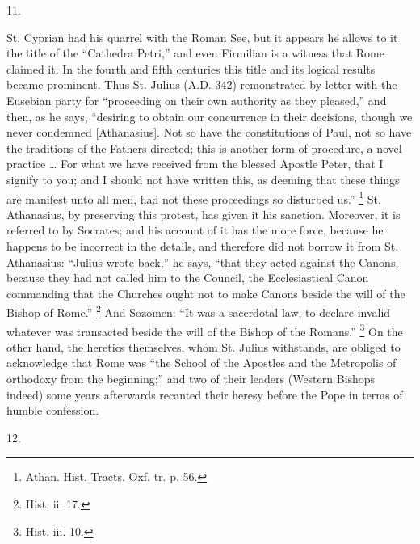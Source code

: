 11.

St. Cyprian had his quarrel with the Roman See, but it
appears he allows to it the title of the ``Cathedra
Petri,'' and even Firmilian is a witness that Rome
claimed it. In the fourth and fifth centuries this title
and its logical results became prominent. Thus St. Julius (A.D. 342) remonstrated by letter with the Eusebian party
for ``proceeding on their own authority as they
pleased,'' and then, as he says, ``desiring to
obtain our concurrence in their decisions, though we
never condemned [Athanasius]. Not so have the
constitutions of Paul, not so have the traditions of the
Fathers directed; this is another form of procedure, a
novel practice … For what we have received from the
blessed Apostle Peter, that I signify to you; and I
should not have written this, as deeming that these
things are manifest unto all men, had not these
proceedings so disturbed us.'' \footnote{Athan. Hist. Tracts. Oxf. tr.
p. 56.} St. Athanasius, by
preserving this protest, has given it his sanction.
Moreover, it is referred to by Socrates; and his account
of it has the more force, because he happens to be incorrect in the details, and therefore did not borrow it
from St. Athanasius: ``Julius wrote back,'' he
says, ``that they acted against the Canons, because
they had not called him to the Council, the
Ecclesiastical Canon commanding that the Churches ought
not to make Canons beside the will of the Bishop of
Rome.'' \footnote{Hist. ii. 17.} And Sozomen: ``It was a sacerdotal law, to
declare invalid whatever was transacted beside the will
of the Bishop of the Romans.'' \footnote{Hist. iii. 10.} On the other hand, the
heretics themselves, whom St. Julius withstands, are
obliged to acknowledge that Rome was ``the School of
the Apostles and the Metropolis of orthodoxy from the
beginning;'' and two of their leaders (Western
Bishops indeed) some years afterwards recanted their
heresy before the Pope in terms of humble confession.

12.

